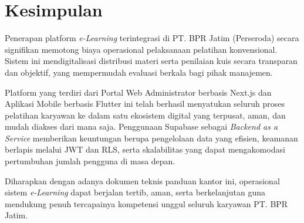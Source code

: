 \section{Kesimpulan}
Penerapan platform \textit{e-Learning} terintegrasi di PT. BPR Jatim (Perseroda) secara signifikan memotong biaya operasional pelaksanaan pelatihan konvensional. Sistem ini mendigitalisasi distribusi materi serta penilaian kuis secara transparan dan objektif, yang mempermudah evaluasi berkala bagi pihak manajemen.

Platform yang terdiri dari Portal Web Administrator berbasis Next.js dan Aplikasi Mobile berbasis Flutter ini telah berhasil menyatukan seluruh proses pelatihan karyawan ke dalam satu ekosistem digital yang terpusat, aman, dan mudah diakses dari mana saja. Penggunaan Supabase sebagai \textit{Backend as a Service} memberikan keuntungan berupa pengelolaan data yang efisien, keamanan berlapis melalui JWT dan RLS, serta skalabilitas yang dapat mengakomodasi pertumbuhan jumlah pengguna di masa depan.

Diharapkan dengan adanya dokumen teknis panduan kantor ini, operasional sistem \textit{e-Learning} dapat berjalan tertib, aman, serta berkelanjutan guna mendukung penuh tercapainya kompetensi unggul seluruh karyawan PT. BPR Jatim.
